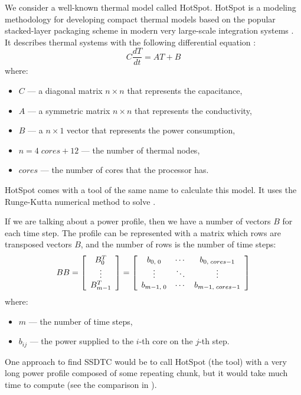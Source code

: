 We consider a well-known thermal model called HotSpot. HotSpot is a modeling methodology for developing compact thermal models based on the popular stacked-layer packaging scheme in modern very large-scale integration systems \cite{huang2006}. It describes thermal systems with the following differential equation \cite{rao2008}:
\begin{equation} \label{eq:initial}
  C \frac{dT}{dt} = AT + B
\end{equation}
where:
\begin{itemize}
  \item $C$ --- a diagonal matrix $n \times n$ that represents the capacitance,
  \item $A$ --- a symmetric matrix $n \times n$ that represents the conductivity,
  \item $B$ --- a $n \times 1$ vector that represents the power consumption,
  \item $n = 4 \; cores + 12$ --- the number of thermal nodes,
  \item $cores$ --- the number of cores that the processor has.
\end{itemize}


HotSpot comes with a tool of the same name to calculate this model. It uses the Runge-Kutta numerical method to solve .

If we are talking about a power profile, then we have a number of vectors $B$ for each time step. The profile can be represented with a matrix which rows are transposed vectors $B$, and the number of rows is the number of time steps:
\[
  BB =
    \left[
      \begin{array}{c}
        B_0^T \\
        \vdots \\
        B_{m-1}^T
      \end{array}
    \right] =
    \left[
      \begin{array}{ccc}
        b_{0,\;0} & \cdots & b_{0,\;cores-1} \\
        \vdots & \ddots & \vdots \\
        b_{m-1,\;0} & \cdots & b_{m-1,\;cores-1}
      \end{array}
    \right]
\]
where:
\begin{itemize}
  \item $m$ --- the number of time steps,
  \item $b_{ij}$ --- the power supplied to the $i$-th core on the $j$-th step.
\end{itemize}

One approach to find SSDTC would be to call HotSpot (the tool) with a very long power profile composed of some repeating chunk, but it would take much time to compute (see the comparison in ).
